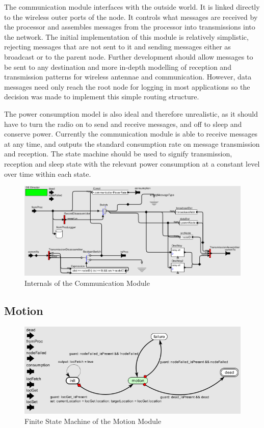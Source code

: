 \documentclass[authoryearcitations]{UoYCSproject}
\begin{document}
The communication module interfaces with the outside world. It is linked directly to the wireless outer ports of the node. It controls what messages are received by the processor and assembles messages from the processor into transmissions into the network. The initial implementation of this module is relatively simplistic, rejecting messages that are not sent to it and sending messages either as broadcast or to the parent node. Further development should allow messages to be sent to any destination and more in-depth modelling of reception and transmission patterns for wireless antennae and communication. However, data messages need only reach the root node for logging in most applications so the decision was made to implement this simple routing structure.

The power consumption model is also ideal and therefore unrealistic, as it should have to turn the radio on to send and receive messages, and off to sleep and conserve power. Currently the communication module is able to receive messages at any time, and outputs the standard consumption rate on message transmission and reception. The state machine should be used to signify transmission, reception and sleep state with the relevant power consumption at a constant level over time within each state.

\begin{figure}
 \centering
    \includegraphics[width=\textwidth]{figures/communicationInternals.png}
    \caption{Internals of the Communication Module}
    \label{fig:commInternals}
\end{figure}

\subsection{Motion}

\begin{figure}
 \centering
    \includegraphics[width=\textwidth]{figures/motion_Controller.png}
    \caption{Finite State Machine of the Motion Module}
    \label{fig:motionControl}
\end{figure}
\end{document}
